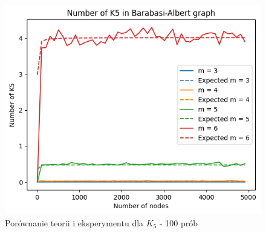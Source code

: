 \documentclass{article}
\begin{document}
\begin{figure}[h!]
  \centering
  \includegraphics[width=13cm]{../images/k5.png}
  \caption{Porównanie teorii i eksperymentu dla $K_{5}$ - 100 prób}
\end{figure}

\newpage
\end{document}
